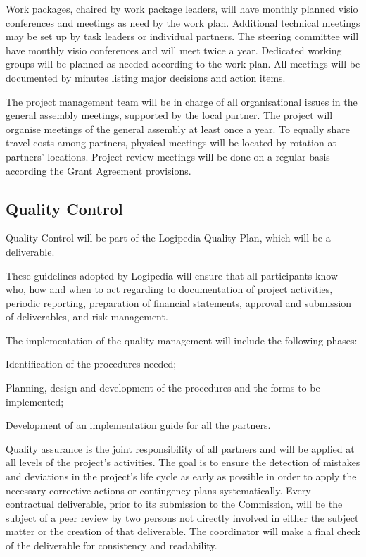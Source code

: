 Work packages, chaired by work package leaders, will have monthly
planned visio conferences and meetings as need by the work plan.
Additional technical meetings may be set up by task leaders or
individual partners. The steering committee will have monthly visio
conferences and will meet twice a year. Dedicated working groups will
be planned as needed according to the work plan.  All meetings will be
documented by minutes listing major decisions and action items.

The project management team will be in charge of all organisational
issues in the general assembly meetings, supported by the local
partner. The project will organise meetings of the general assembly at
least once a year. To equally share travel costs among partners,
physical meetings will be located by rotation at partners’
locations. Project review meetings will be done on a regular basis
according the Grant Agreement provisions.



\subsection*{Quality Control}

Quality Control will be part of the
Logipedia Quality Plan, which will be a deliverable.

These guidelines adopted by Logipedia will ensure that all
participants know who, how and when to act regarding to documentation
of project activities, periodic reporting, preparation of financial
statements, approval and submission of deliverables, and risk
management.

The implementation of the quality management will include the following phases:
\begin{compactitem}
  \item 
Identification of the procedures needed;
\item
  Planning, design and development of the procedures and the forms to be implemented;
\item Development of an implementation guide for all the partners.
\end{compactitem}

Quality assurance is the joint responsibility of all partners and will
be applied at all levels of the project’s activities. The goal is to
ensure the detection of mistakes and deviations in the project’s life
cycle as early as possible in order to apply the necessary corrective
actions or contingency plans systematically. Every contractual
deliverable, prior to its submission to the Commission, will be the
subject of a peer review by two persons not directly involved in
either the subject matter or the creation of that deliverable.
The coordinator will make a final check of the deliverable for
consistency and readability.



